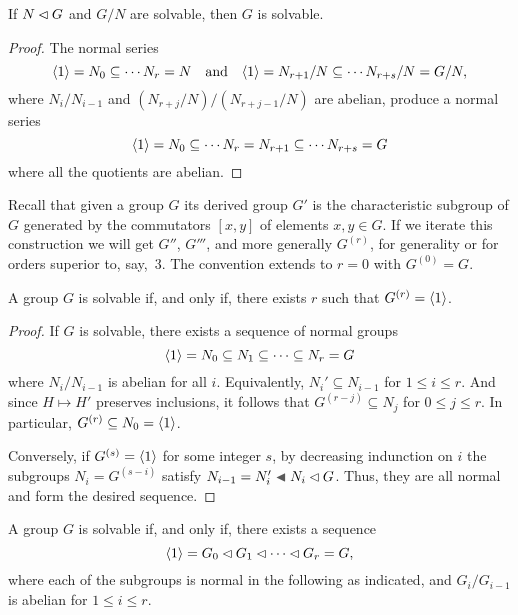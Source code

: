 \begin{prop}\label{solvable-ses}
    If\/ $N\lhd G$ and\/ $G/N$ are solvable, then\/ $G$ is solvable.
\end{prop}

\begin{proof} The normal series
$$
    \langle1\rangle = N_0\subseteq\cdots N_r=N\quad\text{and}\quad
    \langle1\rangle= N_{r+1}/N\subseteq\cdots N_{r+s}/N = G/N,
$$
where $N_i/N_{i-1}$ and $(N_{r+j}/N)/(N_{r+j-1}/N)$ are abelian, produce a normal series
$$
     \langle1\rangle = N_0\subseteq\cdots N_r= N_{r+1}\subseteq\cdots N_{r+s}=G
$$
where all the quotients are abelian.  \end{proof}

\begin{ntn}
    Recall that given a group\/ $G$ its derived group $G'$ is the characteristic subgroup of\/ $G$ generated by the commutators\/ $[x,y]$ of elements\/ $x,y\in G$. If we iterate this construction we will get\/ $G''$, $G'''$, and more generally\/ $G^{(r)}$, for generality or for orders superior to, say,~$3$. The convention extends to\/ $r=0$ with\/ $G^{(0)}=G$.
\end{ntn}

\begin{prop}\label{solvable-equals-finite-derivatives}
    A group\/ $G$ is solvable if, and only if, there exists\/ $r$ such that\/ $G^{(r)}=\langle1\rangle$.
\end{prop}

\begin{proof} If $G$ is solvable, there exists a sequence of normal groups
$$
    \langle1\rangle=N_0\subseteq N_1\subseteq\cdots\subseteq N_r=G
$$
where $N_i/N_{i-1}$ is abelian for all $i$. Equivalently, $N_i'\subseteq N_{i-1}$ for $1\le i\le r$. And since $H\mapsto H'$ preserves inclusions, it follows that $G^{(r-j)}\subseteq N_j$ for $0\le j\le r$. In particular, $G^{(r)}\subseteq N_0=\langle1\rangle$.

Conversely, if $G^{(s)}=\langle1\rangle$ for some integer $s$, by decreasing indunction on $i$ the subgroups $N_i=G^{(s-i)}$ satisfy $N_{i-1}=N_i'\ch N_i\normal G$. Thus, they are all normal and form the desired sequence.  \end{proof}

\begin{cor}\label{solvable-equivalence}
    A group\/ $G$ is solvable if, and only if, there exists a sequence
    $$
        \langle1\rangle=G_0\lhd G_1\lhd\cdots\lhd G_r=G,
    $$
    where each of the subgroups is normal in the following as indicated, and\/ $G_i/G_{i-1}$ is abelian for\/ $1\le i\le r$.
\end{cor}

